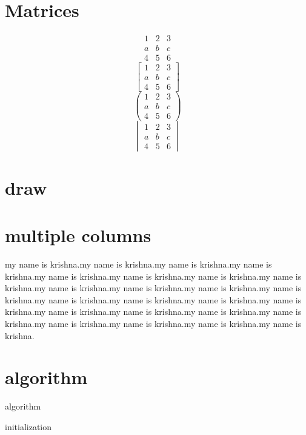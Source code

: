\documentclass[12pt,openany]{book}
\begin{document}
	\section{Matrices}
	$$
	\begin{matrix}
	1 & 2 & 3\\
	a & b & c\\
	4 & 5 & 6
	\end{matrix}
	$$
	$$
	\begin{bmatrix}
	1 & 2 & 3\\
	a & b & c\\
	4 & 5 & 6
	\end{bmatrix}
	$$
	$$
	\begin{pmatrix}
	1 & 2 & 3\\
	a & b & c\\
	4 & 5 & 6
	\end{pmatrix}
	$$
	$$
	\begin{vmatrix}
	1 & 2 & 3\\
	a & b & c\\
	4 & 5 & 6
	\end{vmatrix}
	$$
	\section{draw}
	\vspace{3cm}
	\section{multiple columns}
	\begin{multicols}{2}
		my name is krishna.my name is krishna.my name is krishna.my name is krishna.my name is krishna.my name is krishna.my name is krishna.my name is krishna.my name is krishna.my name is krishna.my name is krishna.my name is krishna.my name is krishna.my name is krishna.my name is krishna.my name is krishna.my name is krishna.my name is krishna.my name is krishna.my name is krishna.my name is krishna.my name is krishna.my name is krishna.my name is krishna.	
	\end{multicols}
	\section{algorithm}
	\begin{algorithm}
		\SetAlgoLined
		\caption{algorithm}
		initialization\;
	\end{algorithm}
	
\end{document}
